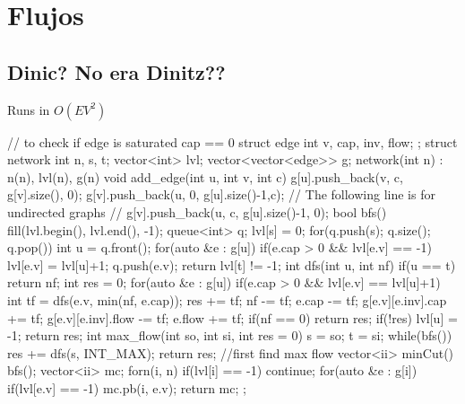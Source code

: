 \documentclass[10pt, landscape, twocolumn, a4paper, notitlepage]{article}
\begin{document}
\section{Flujos}
\subsection{Dinic? No era Dinitz??}
Runs in $O(EV^2)$
\begin{code}
// to check if edge is saturated cap == 0
struct edge { int v, cap, inv, flow; };
struct network {
  int n, s, t;
  vector<int> lvl;
  vector<vector<edge>> g;
  network(int n) : n(n), lvl(n), g(n) {}
  void add_edge(int u, int v, int c) {
    g[u].push_back({v, c, g[v].size(), 0});
    g[v].push_back({u, 0, g[u].size()-1,c});
    // The following line is for undirected graphs
    // g[v].push_back({u, c, g[u].size()-1, 0});
  }
  bool bfs() {
    fill(lvl.begin(), lvl.end(), -1);
    queue<int> q;
    lvl[s] = 0;
    for(q.push(s); q.size(); q.pop()) {
      int u = q.front();
      for(auto &e : g[u]) {
        if(e.cap > 0 && lvl[e.v] == -1) {
          lvl[e.v] = lvl[u]+1;
          q.push(e.v);
        }
      }
    }
    return lvl[t] != -1;
  }
  int dfs(int u, int nf) {
    if(u == t) return nf;
    int res = 0;
    for(auto &e : g[u]) {
      if(e.cap > 0 && lvl[e.v] == lvl[u]+1) {
        int tf = dfs(e.v, min(nf, e.cap));
        res += tf; nf -= tf; e.cap -= tf;
        g[e.v][e.inv].cap += tf;
        g[e.v][e.inv].flow -= tf;
        e.flow += tf;
        if(nf == 0) return res;
      }
    }
    if(!res) lvl[u] = -1;
    return res;
  }
  int max_flow(int so, int si, int res = 0) {
    s = so; t = si;
    while(bfs()) res += dfs(s, INT_MAX);
    return res;
  }
  //first find max flow
  vector<ii> minCut() {
    bfs();
    vector<ii> mc;
    forn(i, n) {
        if(lvl[i] == -1) continue;
        for(auto &e : g[i]) {
            if(lvl[e.v] == -1) {
                mc.pb({i, e.v});
            }
        }
    }
    return mc;
  }
};
\end{code}
\end{document}
